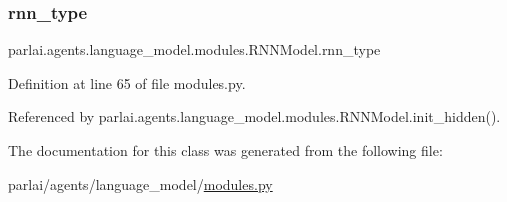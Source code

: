 \subsubsection{\texorpdfstring{rnn\+\_\+type}{rnn\_type}}
{\footnotesize\ttfamily parlai.\+agents.\+language\+\_\+model.\+modules.\+R\+N\+N\+Model.\+rnn\+\_\+type}



Definition at line 65 of file modules.\+py.



Referenced by parlai.\+agents.\+language\+\_\+model.\+modules.\+R\+N\+N\+Model.\+init\+\_\+hidden().



The documentation for this class was generated from the following file\+:\begin{DoxyCompactItemize}
\item 
parlai/agents/language\+\_\+model/\hyperlink{parlai_2agents_2language__model_2modules_8py}{modules.\+py}\end{DoxyCompactItemize}
